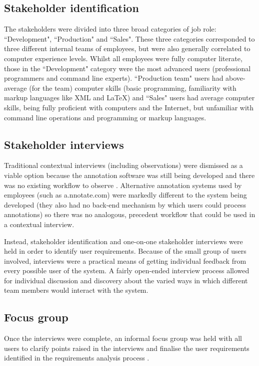 \subsection{Stakeholder identification}
The stakeholders were divided into three broad categories of job role: ``Development", ``Production" and ``Sales". These three categories corresponded to three different internal teams of employees, but were also generally correlated to computer experience levels. Whilst all employees were fully computer literate, those in the ``Development" category were the most advanced users (professional programmers and command line experts). ``Production team" users had above-average (for the team) computer skills (basic programming, familiarity with markup languages like XML and LaTeX) and ``Sales" users had average computer skills, being fully proficient with computers and the Internet,  but unfamiliar with command line operations and programming or markup languages.

\subsection{Stakeholder interviews}
Traditional contextual interviews (including observations) were dismissed as a viable option because the annotation software was still being developed and there was no existing workflow to observe \citep[p. 38]{BeyerHoltzblatt}. Alternative annotation systems used by employees (such as a.nnotate.com) were markedly different to the system being developed (they also had no back-end mechanism by which users could process annotations) so there was no analogous, precedent workflow that could be used in a contextual interview. 

Instead, stakeholder identification and one-on-one stakeholder interviews were held in order to identify user requirements. Because of the small group of users involved, interviews were a practical means of getting individual feedback from every possible user of the system. A fairly open-ended interview process allowed for individual discussion and discovery about the varied ways in which different team members would interact with the system. 

\subsection{Focus group}
Once the interviews were complete, an informal focus group was held with all users to clarify points raised in the interviews and finalise the user requirements identified in the requirements analysis process \citep[p. 365]{RogersPreece}. 

